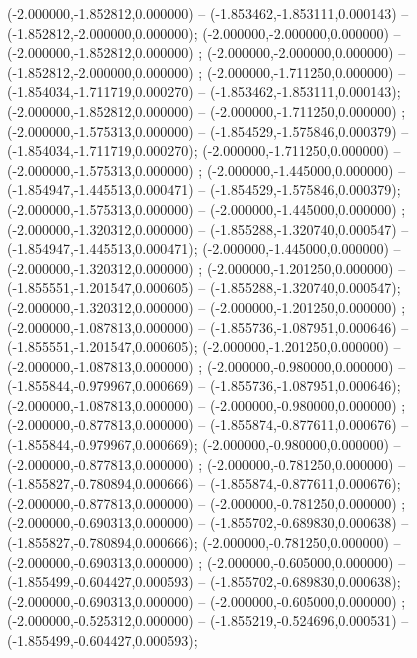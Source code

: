  (-2.000000,-1.852812,0.000000) -- (-1.853462,-1.853111,0.000143) -- (-1.852812,-2.000000,0.000000);
 (-2.000000,-2.000000,0.000000) -- (-2.000000,-1.852812,0.000000) ;
 (-2.000000,-2.000000,0.000000) -- (-1.852812,-2.000000,0.000000) ;
 (-2.000000,-1.711250,0.000000) -- (-1.854034,-1.711719,0.000270) -- (-1.853462,-1.853111,0.000143);
 (-2.000000,-1.852812,0.000000) -- (-2.000000,-1.711250,0.000000) ;
 (-2.000000,-1.575313,0.000000) -- (-1.854529,-1.575846,0.000379) -- (-1.854034,-1.711719,0.000270);
 (-2.000000,-1.711250,0.000000) -- (-2.000000,-1.575313,0.000000) ;
 (-2.000000,-1.445000,0.000000) -- (-1.854947,-1.445513,0.000471) -- (-1.854529,-1.575846,0.000379);
 (-2.000000,-1.575313,0.000000) -- (-2.000000,-1.445000,0.000000) ;
 (-2.000000,-1.320312,0.000000) -- (-1.855288,-1.320740,0.000547) -- (-1.854947,-1.445513,0.000471);
 (-2.000000,-1.445000,0.000000) -- (-2.000000,-1.320312,0.000000) ;
 (-2.000000,-1.201250,0.000000) -- (-1.855551,-1.201547,0.000605) -- (-1.855288,-1.320740,0.000547);
 (-2.000000,-1.320312,0.000000) -- (-2.000000,-1.201250,0.000000) ;
 (-2.000000,-1.087813,0.000000) -- (-1.855736,-1.087951,0.000646) -- (-1.855551,-1.201547,0.000605);
 (-2.000000,-1.201250,0.000000) -- (-2.000000,-1.087813,0.000000) ;
 (-2.000000,-0.980000,0.000000) -- (-1.855844,-0.979967,0.000669) -- (-1.855736,-1.087951,0.000646);
 (-2.000000,-1.087813,0.000000) -- (-2.000000,-0.980000,0.000000) ;
 (-2.000000,-0.877813,0.000000) -- (-1.855874,-0.877611,0.000676) -- (-1.855844,-0.979967,0.000669);
 (-2.000000,-0.980000,0.000000) -- (-2.000000,-0.877813,0.000000) ;
 (-2.000000,-0.781250,0.000000) -- (-1.855827,-0.780894,0.000666) -- (-1.855874,-0.877611,0.000676);
 (-2.000000,-0.877813,0.000000) -- (-2.000000,-0.781250,0.000000) ;
 (-2.000000,-0.690313,0.000000) -- (-1.855702,-0.689830,0.000638) -- (-1.855827,-0.780894,0.000666);
 (-2.000000,-0.781250,0.000000) -- (-2.000000,-0.690313,0.000000) ;
 (-2.000000,-0.605000,0.000000) -- (-1.855499,-0.604427,0.000593) -- (-1.855702,-0.689830,0.000638);
 (-2.000000,-0.690313,0.000000) -- (-2.000000,-0.605000,0.000000) ;
 (-2.000000,-0.525312,0.000000) -- (-1.855219,-0.524696,0.000531) -- (-1.855499,-0.604427,0.000593);
